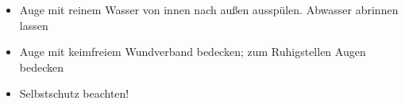 \label{m:ehi-veraetzungen-augen}
\begin{itemize}
    \item Auge mit reinem Wasser von innen nach außen ausspülen. Abwasser
     abrinnen lassen
    \item Auge mit keimfreiem Wundverband bedecken; zum Ruhigstellen 
    Augen bedecken
    \item Selbstschutz beachten!
\end{itemize}